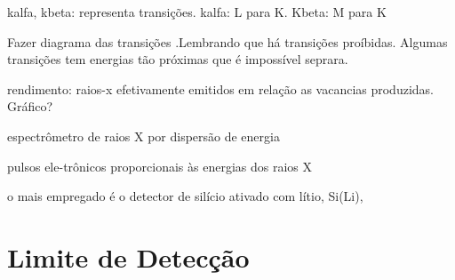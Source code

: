 kalfa, kbeta: representa transições. kalfa: L para K. Kbeta: M para K

Fazer diagrama das transições .Lembrando que há transições proíbidas. Algumas transições tem energias tão próximas que é impossível seprara.


rendimento: raios-x efetivamente emitidos em relação as vacancias produzidas. Gráfico?

espectrômetro de raios X por dispersão de energia

pulsos ele-trônicos proporcionais às energias dos raios X

o mais empregado é o detector de silício ativado com lítio, Si(Li),
 


\section{Limite de Detecção}



